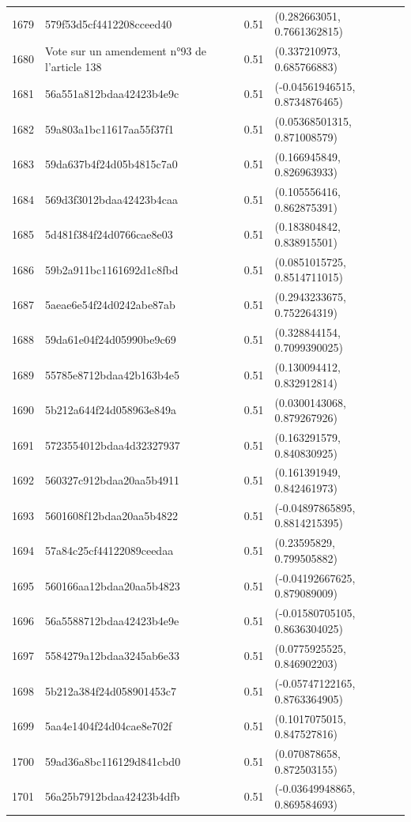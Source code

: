 \begin{table}[ht]
\begin{tabular}{rlrl}
  1679 & 579f53d5cf4412208cceed40 & 0.51 & (0.282663051, 0.7661362815) \\ 
  1680 & Vote sur un amendement n°93 de l'article 138 & 0.51 & (0.337210973, 0.685766883) \\ 
  1681 & 56a551a812bdaa42423b4e9c & 0.51 & (-0.04561946515, 0.8734876465) \\ 
  1682 & 59a803a1bc11617aa55f37f1 & 0.51 & (0.05368501315, 0.871008579) \\ 
  1683 & 59da637b4f24d05b4815c7a0 & 0.51 & (0.166945849, 0.826963933) \\ 
  1684 & 569d3f3012bdaa42423b4caa & 0.51 & (0.105556416, 0.862875391) \\ 
  1685 & 5d481f384f24d0766cae8e03 & 0.51 & (0.183804842, 0.838915501) \\ 
  1686 & 59b2a911bc1161692d1c8fbd & 0.51 & (0.0851015725, 0.8514711015) \\ 
  1687 & 5aeae6e54f24d0242abe87ab & 0.51 & (0.2943233675, 0.752264319) \\ 
  1688 & 59da61e04f24d05990be9c69 & 0.51 & (0.328844154, 0.7099390025) \\ 
  1689 & 55785e8712bdaa42b163b4e5 & 0.51 & (0.130094412, 0.832912814) \\ 
  1690 & 5b212a644f24d058963e849a & 0.51 & (0.0300143068, 0.879267926) \\ 
  1691 & 5723554012bdaa4d32327937 & 0.51 & (0.163291579, 0.840830925) \\ 
  1692 & 560327c912bdaa20aa5b4911 & 0.51 & (0.161391949, 0.842461973) \\ 
  1693 & 5601608f12bdaa20aa5b4822 & 0.51 & (-0.04897865895, 0.8814215395) \\ 
  1694 & 57a84c25cf44122089ceedaa & 0.51 & (0.23595829, 0.799505882) \\ 
  1695 & 560166aa12bdaa20aa5b4823 & 0.51 & (-0.04192667625, 0.879089009) \\ 
  1696 & 56a5588712bdaa42423b4e9e & 0.51 & (-0.01580705105, 0.8636304025) \\ 
  1697 & 5584279a12bdaa3245ab6e33 & 0.51 & (0.0775925525, 0.846902203) \\ 
  1698 & 5b212a384f24d058901453c7 & 0.51 & (-0.05747122165, 0.8763364905) \\ 
  1699 & 5aa4e1404f24d04cae8e702f & 0.51 & (0.1017075015, 0.847527816) \\ 
  1700 & 59ad36a8bc116129d841cbd0 & 0.51 & (0.070878658, 0.872503155) \\ 
  1701 & 56a25b7912bdaa42423b4dfb & 0.51 & (-0.03649948865, 0.869584693) \\ 

\end{tabular}
\end{table}
